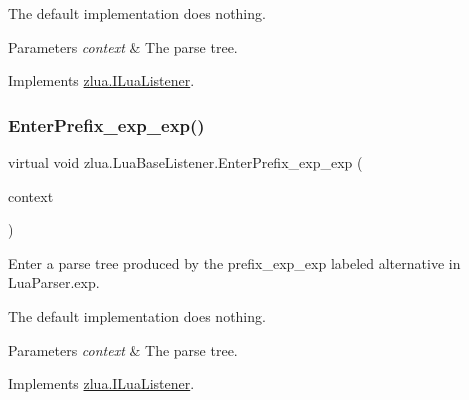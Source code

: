 The default implementation does nothing.


\begin{DoxyParams}{Parameters}
{\em context} & The parse tree.\\
\hline
\end{DoxyParams}


Implements \mbox{\hyperlink{interfacezlua_1_1_i_lua_listener_a406fd2bdc9cefe77567f3012bed007e9}{zlua.\+I\+Lua\+Listener}}.

\mbox{\label{classzlua_1_1_lua_base_listener_aa1c31e6fda9d54bd984d3d5d5c0ff8ed}} 
\subsubsection{\texorpdfstring{Enter\+Prefix\+\_\+exp\+\_\+exp()}{EnterPrefix\_exp\_exp()}}
{\footnotesize\ttfamily virtual void zlua.\+Lua\+Base\+Listener.\+Enter\+Prefix\+\_\+exp\+\_\+exp (\begin{DoxyParamCaption}\item[{\mbox{[}\+Not\+Null\mbox{]} \mbox{\hyperlink{classzlua_1_1_lua_parser_1_1_prefix__exp__exp_context}{Lua\+Parser.\+Prefix\+\_\+exp\+\_\+exp\+Context}}}]{context }\end{DoxyParamCaption})\hspace{0.3cm}{\ttfamily [virtual]}}



Enter a parse tree produced by the {\ttfamily prefix\+\_\+exp\+\_\+exp} labeled alternative in Lua\+Parser.\+exp. 

The default implementation does nothing.


\begin{DoxyParams}{Parameters}
{\em context} & The parse tree.\\
\hline
\end{DoxyParams}


Implements \mbox{\hyperlink{interfacezlua_1_1_i_lua_listener_a4b07c7ca53f3650fc8b83891467f7a66}{zlua.\+I\+Lua\+Listener}}.

\mbox{\label{classzlua_1_1_lua_base_listener_ac17b7407bccd562c7786ef788558e767}} 
